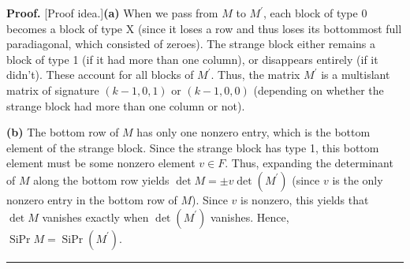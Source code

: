 \documentclass[numbers=enddot,12pt,final,onecolumn,notitlepage]{scrartcl}%
\theoremstyle{definition}
\newenvironment{proof}[1][Proof]{\noindent\textbf{#1.} }{\ \rule{0.5em}{0.5em}}
\theoremstyle{plainsl}
\begin{document}
\begin{proof}
[Proof idea.]\textbf{(a)} When we pass from $M$ to $M^{\prime}$, each block of
type 0 becomes a block of type X (since it loses a row and thus loses its
bottommost full paradiagonal, which consisted of zeroes). The strange block
either remains a block of type 1 (if it had more than one column), or
disappears entirely (if it didn't). These account for all blocks of
$M^{\prime}$. Thus, the matrix $M^{\prime}$ is a multislant matrix of
signature $\left(  k-1,0,1\right)  $ or $\left(  k-1,0,0\right)  $ (depending
on whether the strange block had more than one column or not).

\textbf{(b)} The bottom row of $M$ has only one nonzero entry, which is the
bottom element of the strange block. Since the strange block has type 1, this
bottom element must be some nonzero element $v\in F$. Thus, expanding the
determinant of $M$ along the bottom row yields $\det M=\pm v\det\left(
M^{\prime}\right)  $ (since $v$ is the only nonzero entry in the bottom row of
$M$). Since $v$ is nonzero, this yields that $\det M$ vanishes exactly when
$\det\left(  M^{\prime}\right)  $ vanishes. Hence, $\operatorname*{SiPr}%
M=\operatorname*{SiPr}\left(  M^{\prime}\right)  $.
\end{proof}
\end{document}
